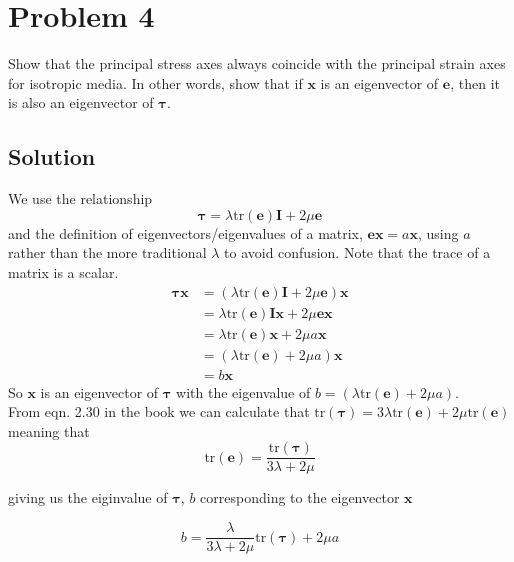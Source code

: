 \section*{Problem 4}
Show that the principal stress axes always coincide with the principal strain axes for isotropic media. In other words, show that if $\mathbf{x}$ is an eigenvector of $\mathbf{e}$, then it is also an eigenvector of $\boldsymbol{\tau}$.

\subsection*{Solution}

We use the relationship
\begin{equation*}
    \boldsymbol{\tau} = 
    \lambda \text{tr}(\mathbf{e})\mathbf{I} +
    2\mu \mathbf{e}
\end{equation*}
and the definition of eigenvectors/eigenvalues of a matrix, $\mathbf{ex} = a \mathbf{x}$, using $a$ rather than the more traditional $\lambda$ to avoid confusion. Note that the trace of a matrix is a scalar.
\begin{align*}
    \boldsymbol{\tau}\mathbf{x} &= (\lambda \text{tr}(\mathbf{e})\mathbf{I} + 2\mu \mathbf{e}) \mathbf{x} \\
    &= \lambda \text{tr}(\mathbf{e})\mathbf{I} \mathbf{x} + 
    2\mu \mathbf{e}\mathbf{x} \\
    &= \lambda \text{tr}(\mathbf{e})\mathbf{x} + 
    2\mu a \mathbf{x} \\
    &= (\lambda \text{tr}(\mathbf{e}) + 
    2\mu a) \mathbf{x} \\
    &= b \mathbf{x}
\end{align*}
So $\mathbf{x}$ is an eigenvector of $\boldsymbol{\tau}$ with the eigenvalue of $b = (\lambda \text{tr}(\mathbf{e}) + 2\mu a)$.\\

From eqn. 2.30 in the book we can calculate that $\text{tr}(\boldsymbol{\tau}) = 3\lambda\text{tr}(\mathbf{e}) + 2 \mu \text{tr}(\mathbf{e})$ meaning that 
\begin{equation*}
    \text{tr}(\mathbf{e}) = \frac{\text{tr}(\boldsymbol{\tau})}{3\lambda + 2\mu}
\end{equation*}

giving us the eiginvalue of $\boldsymbol{\tau}$, $b$ corresponding to the eigenvector $\mathbf{x}$

\begin{equation*}
    b = \frac{\lambda}{3\lambda + 2\mu} \text{tr}(\boldsymbol{\tau}) + 2\mu a
\end{equation*}
